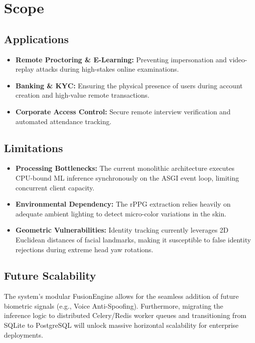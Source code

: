 \documentclass[12pt, a4paper]{report}
\begin{document}
\chapter{Scope}

\section{Applications}
\begin{itemize}
    \item \textbf{Remote Proctoring \& E-Learning:} Preventing impersonation and video-replay attacks during high-stakes online examinations.
    \item \textbf{Banking \& KYC:} Ensuring the physical presence of users during account creation and high-value remote transactions.
    \item \textbf{Corporate Access Control:} Secure remote interview verification and automated attendance tracking.
\end{itemize}

\section{Limitations}
\begin{itemize}
    \item \textbf{Processing Bottlenecks:} The current monolithic architecture executes CPU-bound ML inference synchronously on the ASGI event loop, limiting concurrent client capacity.
    \item \textbf{Environmental Dependency:} The rPPG extraction relies heavily on adequate ambient lighting to detect micro-color variations in the skin. 
    \item \textbf{Geometric Vulnerabilities:} Identity tracking currently leverages 2D Euclidean distances of facial landmarks, making it susceptible to false identity rejections during extreme head yaw rotations.
\end{itemize}

\section{Future Scalability}
The system's modular FusionEngine allows for the seamless addition of future biometric signals (e.g., Voice Anti-Spoofing). Furthermore, migrating the inference logic to distributed Celery/Redis worker queues and transitioning from SQLite to PostgreSQL will unlock massive horizontal scalability for enterprise deployments.
\end{document}
